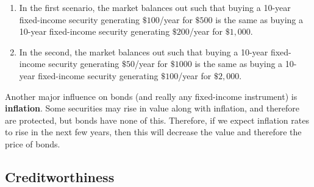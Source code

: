 \documentclass{article}
\begin{document}
    \begin{enumerate}
      \item In the first scenario, the market balances out such that buying a 10-year fixed-income security generating $\$100$/year for $\$500$ is the same as buying a 10-year fixed-income security generating $\$200$/year for $\$1,000$.
      \item In the second, the market balances out such that buying a 10-year fixed-income security generating $\$50$/year for $\$1000$ is the same as buying a 10-year fixed-income security generating $\$100$/year for $\$2,000$.
    \end{enumerate}

    Another major influence on bonds (and really any fixed-income instrument) is \textbf{inflation}. Some securities may rise in value along with inflation, and therefore are protected, but bonds have none of this. Therefore, if we expect inflation rates to rise in the next few years, then this will decrease the value and therefore the price of bonds.

  \subsection{Creditworthiness}
\end{document}
